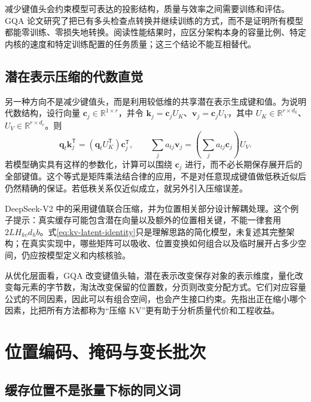 \documentclass[UTF8,12pt,a4paper,fontset=fandol]{ctexart}
\begin{document}
减少键值头会约束模型可表达的投影结构，质量与效率之间需要训练和评估。GQA 论文研究了把已有多头检查点转换并继续训练的方式，而不是证明所有模型都能零训练、零损失地转换\cite{gqa}。阅读性能结果时，应区分架构本身的容量比例、特定内核的速度和特定训练配置的任务质量；这三个结论不能互相替代。

\subsection{潜在表示压缩的代数直觉}

另一种方向不是减少键值头，而是利用较低维的共享潜在表示生成键和值。为说明代数结构，设行向量 $\mathbf c_j\in\mathbb R^{1\times r}$，并令 $\mathbf k_j=\mathbf c_jU_K$、$\mathbf v_j=\mathbf c_jU_V$，其中 $U_K\in\mathbb R^{r\times d_k}$、$U_V\in\mathbb R^{r\times d_v}$。则
\begin{equation}
 \mathbf q_t\mathbf k_j^{\mathsf T}
 =(\mathbf q_tU_K^{\mathsf T})\mathbf c_j^{\mathsf T},
 \qquad
 \sum_j a_{tj}\mathbf v_j
 =\left(\sum_j a_{tj}\mathbf c_j\right)U_V.
 \label{eq:kv-latent-identity}
\end{equation}
若模型确实具有这样的参数化，计算可以围绕 $\mathbf c_j$ 进行，而不必长期保存展开后的全部键值。这个等式是矩阵乘法结合律的应用，不是对任意现成键值做低秩近似后仍然精确的保证。若低秩关系仅近似成立，就另外引入压缩误差。

DeepSeek-V2 中的采用键值联合压缩，并为位置相关部分设计解耦处理\cite{mla}。这个例子提示：真实缓存可能包含潜在向量以及额外的位置相关键，不能一律套用 $2LH_{kv}d_hb$。式\eqref{eq:kv-latent-identity}只是理解思路的简化模型，未复述其完整架构；在真实实现中，哪些矩阵可以吸收、位置变换如何组合以及临时展开占多少空间，仍应按模型定义和内核核验。

从优化层面看，GQA 改变键值头轴，潜在表示改变保存对象的表示维度，量化改变每元素的字节数，淘汰改变保留的位置数，分页则改变分配方式。它们对应容量公式的不同因素，因此可以有组合空间，也会产生接口约束。先指出正在缩小哪个因素，比把所有方法都称为“压缩 KV”更有助于分析质量代价和工程收益。

\section{位置编码、掩码与变长批次}
\label{sec:kv-position-mask}

\subsection{缓存位置不是张量下标的同义词}
\end{document}
